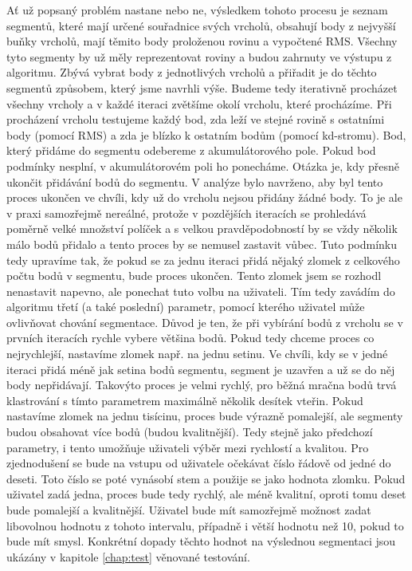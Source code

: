 \documentclass[11pt,twoside,a4paper]{book}
\begin{document}
Ať už popsaný problém nastane nebo ne, výsledkem tohoto procesu je seznam segmentů, které mají určené souřadnice svých vrcholů, obsahují body z nejvyšší buňky vrcholů, mají těmito body proloženou rovinu a vypočtené RMS. Všechny tyto segmenty by už měly reprezentovat roviny a budou zahrnuty ve výstupu z algoritmu. Zbývá vybrat body z jednotlivých vrcholů a přiřadit je do těchto segmentů způsobem, který jsme navrhli výše. Budeme tedy iterativně procházet všechny vrcholy a v každé iteraci zvětšíme okolí vrcholu, které procházíme. Při procházení vrcholu testujeme každý bod, zda leží ve stejné rovině s ostatními body (pomocí RMS) a zda je blízko k ostatním bodům (pomocí kd-stromu). Bod, který přidáme do segmentu odebereme z akumulátorového pole. Pokud bod podmínky nesplní, v akumulátorovém poli ho ponecháme. Otázka je, kdy přesně ukončit přidávání bodů do segmentu. V analýze bylo navrženo, aby byl tento proces ukončen ve chvíli, kdy už do vrcholu nejsou přidány žádné body. To je ale v praxi samozřejmě nereálné, protože v pozdějších iteracích se prohledává poměrně velké množství políček a s velkou pravděpodobností by se vždy několik málo bodů přidalo a tento proces by se nemusel zastavit vůbec. Tuto podmínku tedy upravíme tak, že pokud se za jednu iteraci přidá nějaký zlomek z celkového počtu bodů v segmentu, bude proces ukončen. Tento zlomek jsem se rozhodl nenastavit napevno, ale ponechat tuto volbu na uživateli. Tím tedy zavádím do algoritmu třetí (a také poslední) parametr, pomocí kterého uživatel může ovlivňovat chování segmentace. Důvod je ten, že při vybírání bodů z vrcholu se v prvních iteracích rychle vybere většina bodů. Pokud tedy chceme proces co nejrychlejší, nastavíme zlomek např. na jednu setinu. Ve chvíli, kdy se v jedné iteraci přidá méně jak setina bodů segmentu, segment je uzavřen a už se do něj body nepřidávají. Takovýto proces je velmi rychlý, pro běžná mračna bodů trvá klastrování s tímto parametrem maximálně několik desítek vteřin. Pokud nastavíme zlomek na jednu tisícinu, proces bude výrazně pomalejší, ale segmenty budou obsahovat více bodů (budou kvalitnější). Tedy stejně jako předchozí parametry, i tento umožňuje uživateli výběr mezi rychlostí a kvalitou. Pro zjednodušení se bude na vstupu od uživatele očekávat číslo řádově od jedné do deseti. Toto číslo se poté vynásobí stem a použije se jako hodnota zlomku. Pokud uživatel zadá jedna, proces bude tedy rychlý, ale méně kvalitní, oproti tomu deset bude pomalejší a kvalitnější. Uživatel bude mít samozřejmě možnost zadat libovolnou hodnotu z tohoto intervalu, případně i větší hodnotu než 10, pokud to bude mít smysl. Konkrétní dopady těchto hodnot na výslednou segmentaci jsou ukázány v kapitole \ref{chap:test} věnované testování. 
\end{document}
